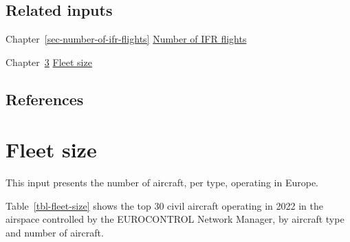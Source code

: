 \documentclass[
  11pt,
  a4paper,
]{book}
\begin{document}
\hypertarget{related-inputs-17}{%
\section{Related inputs}\label{related-inputs-17}}

Chapter~\ref{sec-number-of-ifr-flights}
\protect\hyperlink{sec-number-of-ifr-flights}{Number of IFR flights}

Chapter~\ref{sec-fleet-size} \protect\hyperlink{sec-fleet-size}{Fleet
size}

\hypertarget{references-23}{%
\section{References}\label{references-23}}

\hypertarget{sec-fleet-size}{%
\chapter{Fleet size}\label{sec-fleet-size}}

This input presents the number of aircraft, per type, operating in
Europe.

Table~\ref{tbl-fleet-size} shows the top 30 civil aircraft operating in
2022 in the airspace controlled by the EUROCONTROL Network Manager, by
aircraft type and number of aircraft.
\end{document}
